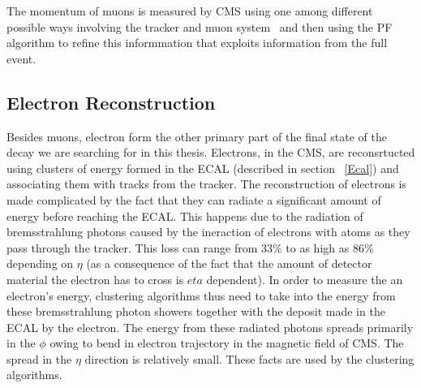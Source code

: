 The momentum of muons is measured by CMS using one among different possible ways involving the tracker and muon system~\cite{muon_recon2012} and then using the PF algorithm to refine this informmation that exploits information from the full event.



\subsection{Electron Reconstruction}
\label{e_recon}
Besides muons, electron form the other primary part of the final state of the decay we are searching for in this thesis. Electrons, in the CMS, are reconsrtucted using clusters of energy formed in the ECAL (described in section ~\ref{Ecal}) and associating them with tracks from the tracker. The reconstruction of electrons is made complicated by the fact that they can radiate a significant amount of energy before reaching the ECAL. This happens due to the radiation of bremsstrahlung photons caused by the ineraction of electrons with atoms as they pass through the tracker. This loss can range from 33\% to as high as 86\% depending on $\eta$ (as a consequence of the fact that the amount of detector material the electron has to cross is $eta$ dependent). In order to measure the an electron's energy,  clustering algorithms thus need to take into the energy from these bremsstrahlung photon showers together with the deposit made in the ECAL by the electron. The energy from these radiated photons spreads primarily in the $\phi$ owing to bend in electron trajectory in the magnetic field of CMS. The spread in the $\eta$ direction is relatively small. These facts are used by the clustering algorithms.

